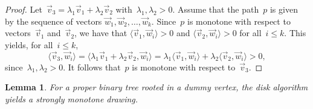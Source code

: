 \documentclass[a4paper,11pt]{article}
\theoremstyle{plain}
\newtheorem{lemma}{Lemma}
\begin{document}
\begin{proof}
  Let~$\vec v_3=\lambda_1 \vec v_1 + \lambda_2 \vec v_2$ 
  with~$\lambda_1,\lambda_2>0$. Assume that the path~$p$ is given by the 
  sequence of vectors $\vec w_1, \vec w_2, \ldots, \vec w_k$.
  Since~$p$ is monotone with respect to vectors~$\vec v_1$ and~$\vec v_2$, we 
  have that $\langle \vec v_1 , \vec w_i \rangle > 0$ and 
  $\langle \vec v_2 , \vec w_i \rangle > 0$ for all~$i\le k$. This yields, for 
  all~$i\le k$,
  $$ \langle \vec v_3 , \vec w_i \rangle 
  = \langle \lambda_1 \vec v_1 + \lambda_2 \vec v_2 , \vec w_i \rangle 
  =  \lambda_1 \langle \vec v_1 , \vec w_i \rangle  + \lambda_2 \langle \vec v_2 , \vec w_i \rangle 
  > 0, $$
  since~$\lambda_1,\lambda_2 >0$. It follows that~$p$ is monotone with respect 
  to~$\vec v_3$.
\end{proof}

\begin{lemma}\label{lem:strict-mon-bintree-proof}
  For a proper binary tree rooted in a dummy vertex,
  the disk algorithm yields a strongly monotone drawing.
\end{lemma}
  
\end{document}
